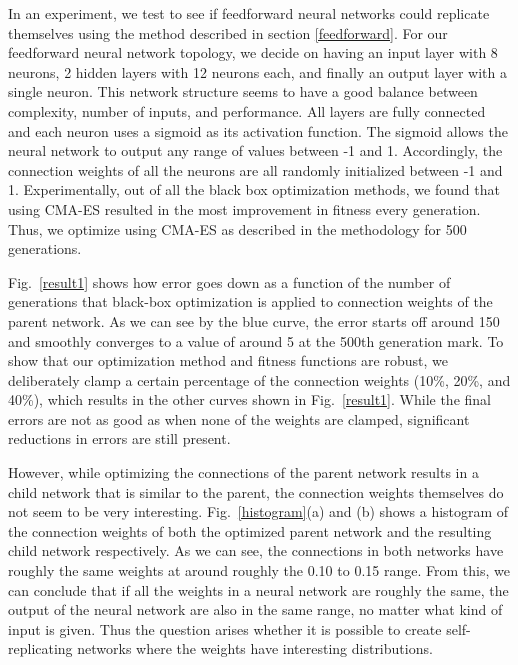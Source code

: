 \documentclass[12pt]{article}
\begin{document}
In an experiment, we test to see if feedforward neural networks
could replicate themselves using the method described
in section \ref{feedforward}.
For our feedforward neural network topology,
we decide on having an input layer with 8 neurons,
2 hidden layers with 12 neurons each,
and finally an output layer with a single neuron.
This network structure seems to have a good balance
between complexity, number of inputs, and performance.
All layers are fully connected
and each neuron uses a sigmoid
as its activation function.
The sigmoid allows the neural network
to output any range of values between -1 and 1.
Accordingly, the connection weights
of all the neurons are all randomly initialized between -1 and 1.
Experimentally, out of all the black box optimization methods, 
we found that using CMA-ES resulted in the most improvement 
in fitness every generation. Thus, we optimize using CMA-ES
as described in the methodology for 500 generations.

Fig.~\ref{result1} shows how error goes down
as a function of the number of generations
that black-box optimization is applied
to connection weights of the parent network.
As we can see by the blue curve,
the error starts off around 150 and smoothly converges
to a value of around 5 at the 500th generation mark.
To show that our optimization method
and fitness functions are robust,
we deliberately clamp a certain percentage
of the connection weights (10\%, 20\%, and 40\%),
which results in the other curves
shown in Fig.~\ref{result1}.
While the final errors are not as good
as when none of the weights are clamped,
significant reductions in errors are still present.

However, while optimizing the connections
of the parent network results in a child network
that is similar to the parent,
the connection weights themselves do not seem
to be very interesting.
Fig.~\ref{histogram}(a) and (b) shows a histogram
of the connection weights
of both the optimized parent network
and the resulting child network respectively.
As we can see, the connections in both networks
have roughly the same weights
at around roughly the 0.10 to 0.15 range.
From this, we can conclude that
if all the weights in a neural network are roughly the same,
the output of the neural network are also in the same range,
no matter what kind of input is given.
Thus the question arises whether it is
possible to create self-replicating networks
where the weights have interesting distributions. 
\end{document}
